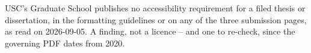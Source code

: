

	{USC's Graduate School publishes no accessibility requirement for a filed
	 thesis or dissertation, in the formatting guidelines or on any of the three
	 submission pages, as read on 2026-09-05. A finding, not a licence -- and
	 one to re-check, since the governing PDF dates from 2020.}

\newcommand{\thesis@copyrightyear}{}
\newcommand{\thesiscopyrightyear}[1]{\renewcommand{\thesis@copyrightyear}{#1}}


